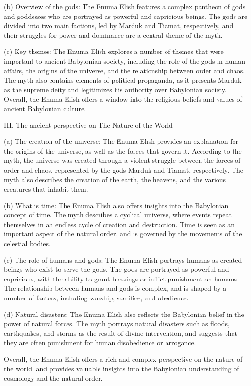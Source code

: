 \documentclass[12pt,a4paper,english]{article}
\begin{document}
(b) Overview of the gods: The Enuma Elish features a complex pantheon of gods and goddesses who are portrayed as powerful and capricious beings. 
The gods are divided into two main factions, led by Marduk and Tiamat, respectively, and their struggles for power and dominance are a central theme of the myth.

(c) Key themes: The Enuma Elish explores a number of themes that were important to ancient Babylonian society, including the role of the gods in human affairs, the origins of the universe, and the relationship between order and chaos. 
The myth also contains elements of political propaganda, as it presents Marduk as the supreme deity and legitimizes his authority over Babylonian society. 
Overall, the Enuma Elish offers a window into the religious beliefs and values of ancient Babylonian culture.

III. The ancient perspective on The Nature of the World

(a) The creation of the universe: The Enuma Elish provides an explanation for the origins of the universe, as well as the forces that govern it. 
According to the myth, the universe was created through a violent struggle between the forces of order and chaos, represented by the gods Marduk and Tiamat, respectively. 
The myth also describes the creation of the earth, the heavens, and the various creatures that inhabit them.

(b) What is time: The Enuma Elish also offers insights into the Babylonian concept of time. 
The myth describes a cyclical universe, where events repeat themselves in an endless cycle of creation and destruction. 
Time is seen as an important aspect of the natural order, and is governed by the movements of the celestial bodies.

(c) The role of humans and gods: The Enuma Elish portrays humans as created beings who exist to serve the gods. 
The gods are portrayed as powerful and capricious, with the ability to grant blessings or inflict punishment on humans. 
The relationship between humans and gods is complex, and is shaped by a number of factors, including worship, sacrifice, and obedience.

(d) Natural disasters: The Enuma Elish also reflects the Babylonian belief in the power of natural forces. 
The myth portrays natural disasters such as floods, earthquakes, and storms as the result of divine intervention, and suggests that they are often punishment for human disobedience or arrogance.

Overall, the Enuma Elish offers a rich and complex perspective on the nature of the world, and provides valuable insights into the Babylonian understanding of cosmology and the natural order.
\end{document}
